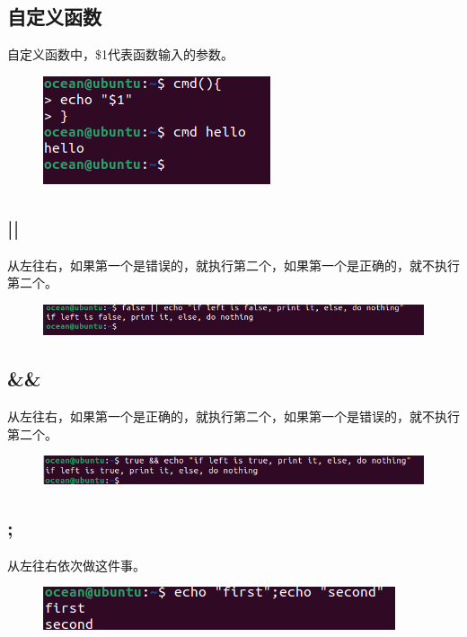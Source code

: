 \documentclass{article}
\begin{document}
\subsection{自定义函数}
自定义函数中，\$1代表函数输入的参数。
\begin{figure}[H]
    \centering
    \includegraphics[width=1\linewidth]{function.png}
\end{figure}

\subsection{||}
从左往右，如果第一个是错误的，就执行第二个，如果第一个是正确的，就不执行第二个。
\begin{figure}[H]
    \centering
    \includegraphics[width=1\linewidth]{or.png}
\end{figure}

\subsection{\&\&}
从左往右，如果第一个是正确的，就执行第二个，如果第一个是错误的，就不执行第二个。
\begin{figure}[H]
    \centering
    \includegraphics[width=1\linewidth]{and.png}
\end{figure}

\subsection{;}
从左往右依次做这件事。
\begin{figure}
    \centering
    \includegraphics[width=1\linewidth]{both.png}
\end{figure}
\end{document}
